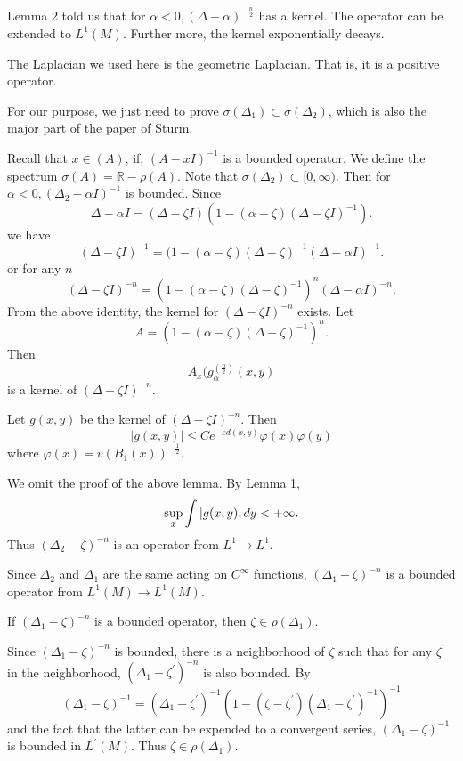 Lemma 2 told us that for $ \alpha < 0 , (\Delta - \alpha ) ^{- \frac{n}{2}} $ has a kernel. The operator can be extended to $ L^1(M)$. Further more, the kernel exponentially decays. 

The Laplacian we used here is the geometric Laplacian. That is, it is a positive operator.

For our purpose, we just need to prove $ \sigma (\Delta _1) \subset \sigma (\Delta _2) $, which is also the major part of the paper of Sturm.

Recall that $ x \in (A) $, if, $ (A - x I ) ^{-1} $ is a bounded operator. We define the spectrum $ \sigma (A) = \mathbb{R} - \rho (A)$.
Note that $ \sigma (\Delta _2) \subset [ 0 , \infty) $. Then for $ \alpha < 0 , (\Delta _2 - \alpha I) ^{-1} $ is bounded. Since 
%
\[ \Delta - \alpha I = (\Delta - \zeta I) ( 1 - (\alpha - \zeta ) ( \Delta - \zeta I)^{-1}). \]
we have
\[ (\Delta - \zeta I ) ^{-1} =   ( 1 - (\alpha - \zeta ) ( \Delta - \zeta )^{-1}  ( \Delta - \alpha I)^{-1}. \]
%
or for any $ n$ 
%
\[ ( \Delta - \zeta I ) ^{-n} =  ( 1 - (\alpha - \zeta ) ( \Delta - \zeta )^{-1})^n (\Delta - \alpha I) ^{-n} .\]
From the above identity, the kernel for $ (\Delta - \zeta I) ^{-n} $ exists. Let 
%
\[A = ( 1 - ( \alpha - \zeta )(
\Delta - \zeta )^{-1} )^n .\]
%
Then
%
\[ A _x ( g _{\alpha} ^{(\frac{n}{2})} (x, y ) \]
%
is a kernel of $ (\Delta - \zeta I) ^{-n} $.

\begin{lemma} Let $ g (x, y) $ be the kernel of $ (\Delta - \zeta I) ^{-n} $. Then 
%
\[ |g (x, y)|\leq C e ^{- \varepsilon d (x, y)} \varphi (x) \varphi (y) \]
%
where $ \varphi (x) = v (B _1 (x))  ^{-\frac{1}{2}} $. 

We omit the proof of the above lemma. By Lemma 1,
%
\[\sup_x \int | g (x, y) \\, dy < + \infty.\]
%
Thus $ (\Delta _2 - \zeta )^{-n} $ is an operator from $ L^1 \rightarrow L^1 $.

Since $ \Delta _2 $ and $ \Delta _1 $ are the same acting on $ C^\infty $ functions, $(\Delta _1 - \zeta )^{-n} $ is a bounded operator from $ L^1 (M) \rightarrow L^1 (M) $. 
\end{lemma}
\begin{lemma} If $( \Delta_1 - \zeta) ^{-n} $ is a bounded operator, then $ \zeta \in \rho (\Delta _1)$.
\end{lemma}

 Since $ ( \Delta _1 - \zeta )^{-n} $ is bounded, there is a neighborhood of $ \zeta$ such that for any $ \zeta^\prime $ in the neighborhood, $ (\Delta _1 - \zeta ^\prime )^{-n} $ is also bounded. By 
%
\[ ( \Delta _1 - \zeta )^{-1} = ( \Delta _1 - \zeta^\prime )^{-1} ( 1 - ( \zeta - \zeta ^\prime )( \Delta _1 - \zeta^\prime  )^{-1}) ^{-1} \]
%
and the fact that the latter can be expended to a convergent series, $ ( \Delta _1 - \zeta )^{-1}  $ is bounded in $ L^\prime (M)$. Thus $ \zeta \in \rho (\Delta _1) $. 

